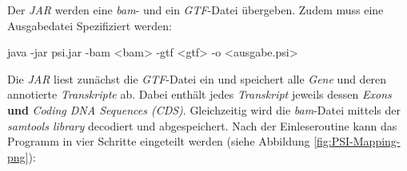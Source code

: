 \documentclass[12pt]{article}
\begin{document}
Der \textit{JAR} werden eine \textit{bam}- und ein \textit{GTF}-Datei übergeben.
Zudem muss eine Ausgabedatei Spezifiziert werden:
\begin{verbatim*}
    java -jar psi.jar -bam <bam> 
                      -gtf <gtf> 
                      -o <ausgabe.psi>
\end{verbatim*}

Die \textit{JAR} liest zunächst die \textit{GTF}-Datei ein und speichert alle \textit{Gene} und deren annotierte
\textit{Transkripte} ab. 
Dabei enthält jedes \textit{Transkript} jeweils dessen \textit{Exons} \textbf{und} \textit{Coding DNA Sequences (CDS)}.
Gleichzeitig wird die \textit{bam}-Datei mittels der \textit{samtools library} decodiert und abgespeichert.
Nach der Einleseroutine kann das Programm in vier Schritte eingeteilt werden (siehe Abbildung \ref{fig:PSI-Mapping-png}):
\end{document}
